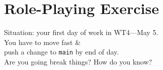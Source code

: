 \documentclass{beamer}
\begin{document}

\part{Role-Playing Exercise}
\begin{frame}
  \partpage
\end{frame}

\begin{frame}
  \begin{center}
    \Large Situation: your first day of work in WT4---May 5. \\[1em]
    You have to move fast \& \\
    push a change to {\tt main} by end of day.\\[1em]
    Are you going break things? How do you know?
  \end{center}
\end{frame}

\begin{frame}
\end{frame}
\end{document}
